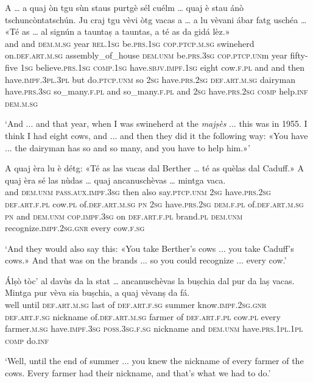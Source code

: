 \begin{linenumbers}
	\gll A … a quaj òn tgu sùn staus purtgè sél cuélm … quaj è stau ánò tschuncòntatschún. Ju craj tgu vèvi òtg vacas a … a lu vèvani ábar fatg uschéa … «Té as … al signún a tauntaṣ a tauntas, a té as da gidá lèz.»\\
and {} and \textsc{dem.m.sg} year \textsc{rel.1sg} be.\textsc{prs.1sg} \textsc{cop.ptcp.m.sg} swineherd on.\textsc{def.art.m.sg} assembly\_of\_house {} \textsc{dem.unm} be.\textsc{prs.3sg} \textsc{cop.ptcp.un}m year fifty-five \textsc{1sg} believe.\textsc{prs.1sg} \textsc{comp.1sg} have.\textsc{sbjv.impf.1sg} eight cow.\textsc{f.pl} and {} and then have.\textsc{impf.3pl.3pl} but  do.\textsc{ptcp.unm} so {} \textsc{2sg} have.\textsc{prs.2sg} {} \textsc{def.art.m.sg} dairyman have\textsc{.prs.3sg} so\_many.\textsc{f.pl} and so\_many.\textsc{f.pl} and \textsc{2sg} have.\textsc{prs.2sg} \textsc{comp} help.\textsc{inf} \textsc{dem.m.sg}	\\
\end{linenumbers}
\medskip
\glt `And ... and that year, when I was swineherd at the \textit{majṣès} ... this was in 1955. I think I had eight cows, and ... and then they did it the following way: «You have ... the dairyman has so and so many, and you have to help him.»'
\medskip

\begin{linenumbers}
	\gll A quaj èra lu è détg: «Té as las vacas dal Berther … té as quèlas dal Caduff.» A quaj èra sé las nùdas … quaj ancanuschèvas … mintga vaca.\\
	and \textsc{dem.unm} \textsc{pass.aux.impf.3sg} then also say.\textsc{ptcp.unm} \textsc{2sg} have.\textsc{prs.2sg} \textsc{def.art.f.pl} cow.\textsc{pl} of.\textsc{def.art.m.sg} \textsc{pn} {} \textsc{2sg} have.\textsc{prs.2sg} \textsc{dem.f.pl} of.\textsc{def.art.m.sg} \textsc{pn} and \textsc{dem.unm} \textsc{cop.impf.3sg} on \textsc{def.art.f.pl} brand.\textsc{pl} {} \textsc{dem.unm} recognize.\textsc{impf.2sg.gnr} {} every cow.\textsc{f.sg}\\
\end{linenumbers}
\medskip
\glt `And they would also say this: «You take Berther's cows ... you take Caduff's cows.» And that was on the brands ... so you could recognize ... every cow.'
\medskip

\begin{linenumbers}
	\gll Álṣò tòc’ al davùs da la stat … ancanuschèvas la buṣchia dal pur da laṣ vacas. Mintga pur vèva sia buṣchia, a quaj vèvanṣ da fá.\\
	well until \textsc{def.art.m.sg} last of \textsc{def.art.f.sg} summer {} know.\textsc{impf.2sg.gnr} \textsc{def.art.f.sg} nickname of.\textsc{def.art.m.sg} farmer of \textsc{def.art.f.pl} cow.\textsc{pl} every farmer.\textsc{m.sg} have.\textsc{impf.3sg} \textsc{poss.3sg.f.sg} nickname and \textsc{dem.unm} have.\textsc{prs.1pl.1pl} \textsc{comp} do.\textsc{inf}\\
\end{linenumbers}
\medskip
\glt `Well, until the end of summer ... you knew the nickname of every farmer of the cows. Every farmer had their nickname, and that's what we had to do.'
\medskip

